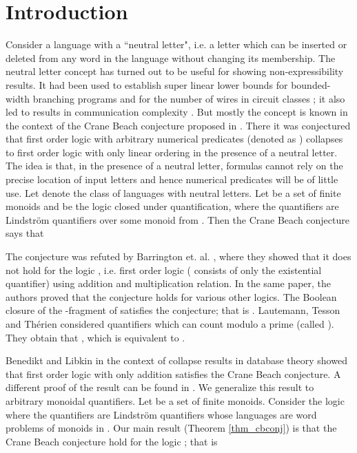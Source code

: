 \documentclass[envcountsame]{llncs}
\begin{document}
\section{Introduction}
Consider a language with a ``neutral letter", i.e. a letter which can be inserted or deleted from any word in the language without 
changing its membership. The neutral letter concept has turned out to be useful for showing non-expressibility results. 
It had been used to establish super linear lower bounds for bounded-width branching
programs \cite{barr_superLinLBBWBP} and for the number of wires in circuit classes \cite{koucky_wiresVsGates}; it also led to results in communication complexity \cite{bddMultiPartyCommCompl}.
But mostly the concept is known in the context of the Crane Beach conjecture  proposed in \cite{barr_cbconj}.
There it was conjectured that first order logic with arbitrary numerical predicates (denoted as )  collapses to 
first order logic with only linear ordering in the presence of a neutral letter. The idea is that, in the presence of a neutral letter, formulas cannot rely on the precise location of input letters and hence numerical predicates will be of little use. Let  denote the class of languages with neutral letters. 
Let  be a set of finite monoids  and  be the logic closed under quantification, where the quantifiers are Lindstr\"om quantifiers over some monoid from . Then the Crane Beach conjecture says that 

The conjecture was refuted by Barrington et. al. \cite{barr_cbconj}, where they showed that it does not hold for the logic , i.e. 
first order logic ( consists of only the existential quantifier) using addition and multiplication relation. 
In the same paper, the authors proved that the conjecture holds for various other logics. The Boolean closure of the -fragment of  satisfies the conjecture; that is . 
Lautemann, Tesson and Th\'erien \cite{ltt06} considered quantifiers which can count modulo a prime  (called ). They obtain that , which is equivalent to .

Benedikt and Libkin \cite{libkin_relIntrStruc} in the context of collapse results in database theory showed that first order logic
with only addition satisfies the Crane Beach conjecture. A different proof of the result can be found in \cite{barr_cbconj}. 
We generalize this result to arbitrary monoidal quantifiers. Let  be a set of finite monoids. Consider the logic
 where the quantifiers are Lindstr\"om quantifiers whose languages are word problems of monoids in . Our main result
(Theorem \ref{thm_cbconj}) is that the Crane Beach conjecture hold for the logic ; that is
\end{document}
